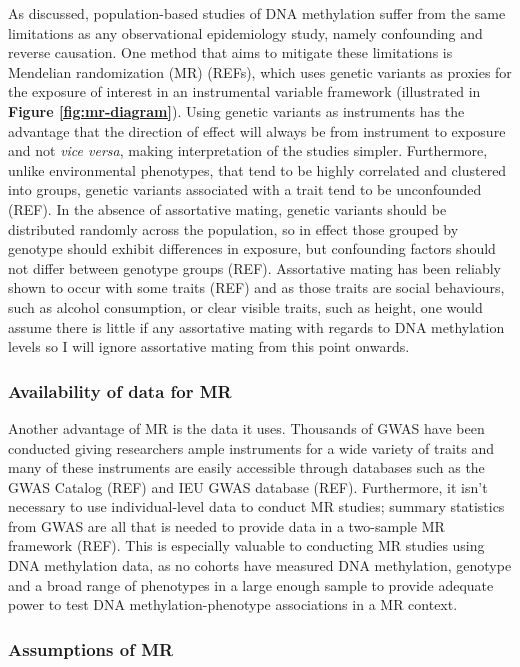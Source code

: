 \documentclass[11pt,twoside]{bristolthesis}
\begin{document}
As discussed, population-based studies of DNA methylation suffer from the same limitations as any observational epidemiology study, namely confounding and reverse causation. One method that aims to mitigate these limitations is Mendelian randomization (MR) (REFs), which uses genetic variants as proxies for the exposure of interest in an instrumental variable framework (illustrated in \textbf{Figure \ref{fig:mr-diagram}}). Using genetic variants as instruments has the advantage that the direction of effect will always be from instrument to exposure and not \emph{vice versa}, making interpretation of the studies simpler. Furthermore, unlike environmental phenotypes, that tend to be highly correlated and clustered into groups, genetic variants associated with a trait tend to be unconfounded (REF). In the absence of assortative mating, genetic variants should be distributed randomly across the population, so in effect those grouped by genotype should exhibit differences in exposure, but confounding factors should not differ between genotype groups (REF). Assortative mating has been reliably shown to occur with some traits (REF) and as those traits are social behaviours, such as alcohol consumption, or clear visible traits, such as height, one would assume there is little if any assortative mating with regards to DNA methylation levels so I will ignore assortative mating from this point onwards.

\hypertarget{availability-of-data-for-mr}{%
\subsubsection{Availability of data for MR}\label{availability-of-data-for-mr}}

Another advantage of MR is the data it uses. Thousands of GWAS have been conducted giving researchers ample instruments for a wide variety of traits and many of these instruments are easily accessible through databases such as the GWAS Catalog (REF) and IEU GWAS database (REF). Furthermore, it isn't necessary to use individual-level data to conduct MR studies; summary statistics from GWAS are all that is needed to provide data in a two-sample MR framework (REF). This is especially valuable to conducting MR studies using DNA methylation data, as no cohorts have measured DNA methylation, genotype and a broad range of phenotypes in a large enough sample to provide adequate power to test DNA methylation-phenotype associations in a MR context.

\hypertarget{assumptions-of-mr}{%
\subsubsection{Assumptions of MR}\label{assumptions-of-mr}}
\end{document}
